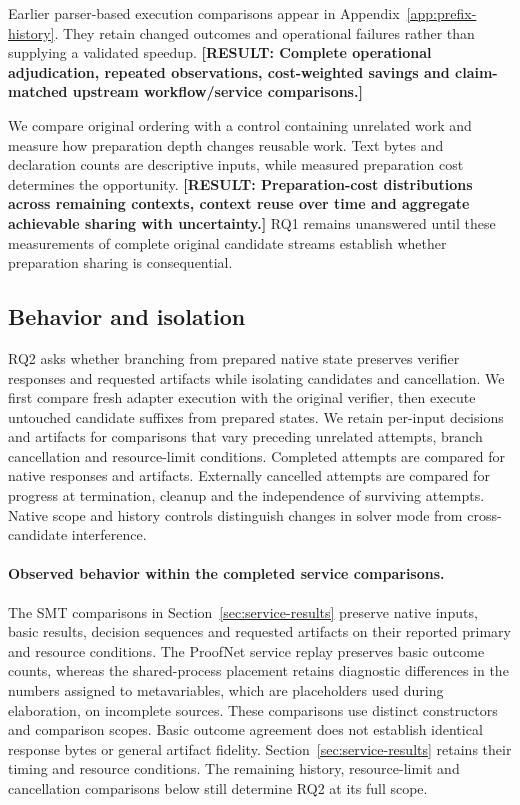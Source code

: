 \documentclass[10pt,twocolumn]{article}
\newcommand{\missing}[1]{\textbf{[RESULT: #1]}}
\begin{document}
Earlier parser-based execution comparisons appear in Appendix~\ref{app:prefix-history}. They retain changed outcomes and operational failures rather than supplying a validated speedup.
\missing{Complete operational adjudication, repeated observations,
cost-weighted savings and claim-matched upstream workflow/service comparisons.}

We compare original ordering with a control containing unrelated work and measure how preparation depth changes reusable work. Text bytes and declaration counts are descriptive inputs, while measured preparation cost determines the opportunity. \missing{Preparation-cost distributions across remaining contexts, context reuse over time and aggregate achievable sharing with uncertainty.} RQ1 remains unanswered until these measurements of complete original candidate streams establish whether preparation sharing is consequential.

\subsection{Behavior and isolation}\label{sec:behavior-results}
RQ2 asks whether branching from prepared native state preserves verifier responses and requested artifacts while isolating candidates and cancellation. We first compare fresh adapter execution with the original verifier, then execute untouched candidate suffixes from prepared states. We retain per-input decisions and artifacts for comparisons that vary preceding unrelated attempts, branch cancellation and resource-limit conditions. Completed attempts are compared for native responses and artifacts. Externally cancelled attempts are compared for progress at termination, cleanup and the independence of surviving attempts. Native scope and history controls distinguish changes in solver mode from cross-candidate interference.

\paragraph{Observed behavior within the completed service comparisons.}
The SMT comparisons in Section~\ref{sec:service-results} preserve native
inputs, basic results, decision sequences and requested artifacts on their
reported primary and resource conditions. The ProofNet service replay
preserves basic outcome counts, whereas the shared-process placement retains
diagnostic differences in the numbers assigned to metavariables, which are
placeholders used during elaboration, on incomplete sources.
These comparisons use distinct constructors and comparison scopes. Basic outcome agreement
does not establish identical response bytes or general artifact fidelity.
Section~\ref{sec:service-results} retains their timing and resource conditions.
The remaining history, resource-limit and cancellation comparisons below
still determine RQ2 at its full scope.
\end{document}
